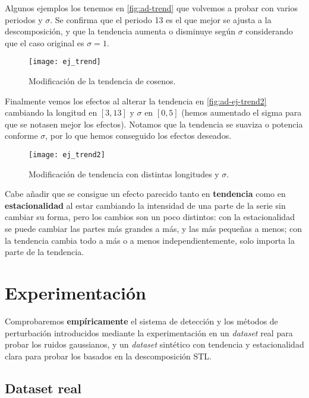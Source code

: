 Algunos ejemplos los tenemos en \autoref{fig:ad-trend} que volvemos a probar con varios periodos y $\sigma$. Se confirma que el periodo 13 es el que mejor se ajusta a la descomposición, y que la tendencia aumenta o disminuye según $\sigma$ considerando que el caso original es $\sigma = 1$.

\begin{figure}[htpb]
  \centering
  \texttt{[image: ej\_trend]}
  \caption{Modificación de la tendencia de cosenos.}
  \label{fig:ad-trend}
\end{figure}

Finalmente vemos los efectos al alterar la tendencia en \autoref{fig:ad-ej-trend2} cambiando la longitud en $[3, 13]$ y $\sigma$ en $[0, 5]$ (hemos aumentado el sigma para que se notasen mejor los efectos). Notamos que la tendencia se suaviza o potencia conforme $\sigma$, por lo que hemos conseguido los efectos deseados.

\begin{figure}[htpb]
  \centering
  \texttt{[image: ej\_trend2]}
  \caption{Modificación de tendencia con distintas longitudes y $\sigma$.}
  \label{fig:ad-ej-trend2}
\end{figure}

Cabe añadir que se consigue un efecto parecido tanto en \textbf{tendencia} como en \textbf{estacionalidad} al estar cambiando la intensidad de una parte de la serie sin cambiar su forma, pero los cambios son un poco distintos: con la estacionalidad se puede cambiar las partes más grandes a más, y las más pequeñas a menos; con la tendencia cambia todo a más o a menos independientemente, solo importa la parte de la tendencia.

\chapter{Experimentación}\label{ch:ad-experimentacion}

Comprobaremos \textbf{empíricamente} el sistema de detección y los métodos de perturbación introducidos mediante la experimentación en un \emph{dataset} real para probar los ruidos gaussianos, y un \emph{dataset} sintético con tendencia y estacionalidad clara para probar los basados en la descomposición STL.

\section{Dataset real}


